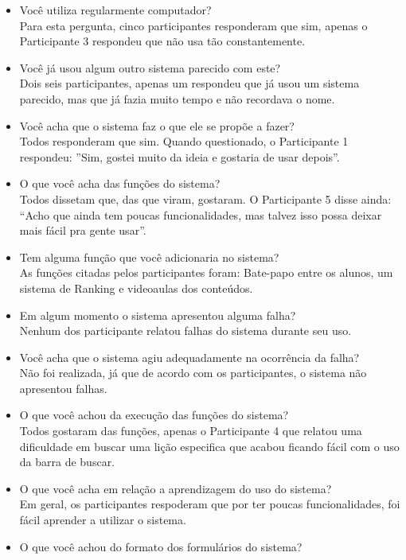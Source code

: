 \begin{itemize}
	\item Você utiliza regularmente computador? \\
	Para esta pergunta, cinco participantes responderam que sim, apenas o Participante 3 respondeu que não usa tão constantemente.
	\item Você já usou algum outro sistema parecido com este? \\	
	Dois seis participantes, apenas um respondeu que já usou um sistema parecido, mas que já fazia muito tempo e não recordava o nome.
	\item Você acha que o sistema faz o que ele se propõe a fazer? \\
	Todos responderam que sim. Quando questionado, o Participante 1 respondeu: ''Sim, gostei muito da ideia e gostaria de usar depois''.
	\item O que você acha das funções do sistema? \\
	Todos dissetam que, das que viram, gostaram. O Participante 5 disse ainda: ``Acho que ainda tem poucas funcionalidades, mas talvez isso possa deixar mais fácil pra gente usar''.
	\item Tem alguma função que você adicionaria no sistema? \\
	As funções citadas pelos participantes foram: Bate-papo entre os alunos, um sistema de Ranking e videoaulas dos conteúdos. 
	\item Em algum momento o sistema apresentou alguma falha? \\
	Nenhum dos participante relatou falhas do sistema durante seu uso.
	\item Você acha que o sistema agiu adequadamente na ocorrência da falha? \\
	Não foi realizada, já que de acordo com os participantes, o sistema não apresentou falhas.
	\item O que você achou da execução das funções do sistema? \\
	Todos gostaram das funções, apenas o Participante 4 que relatou uma dificuldade em buscar uma lição especifica que acabou ficando fácil com o uso da barra de buscar.
	\item O que você acha em relação a aprendizagem do uso do sistema? \\
	Em geral, os participantes respoderam que por ter poucas funcionalidades, foi fácil aprender a utilizar o sistema. 
	\item O que você achou do formato dos formulários do sistema? \\

\end{itemize}
